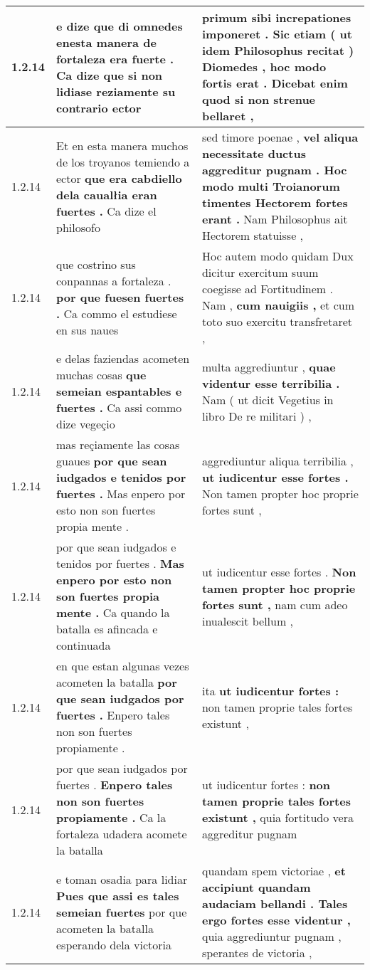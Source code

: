 \begin{tabular}{|p{1cm}|p{6.5cm}|p{6.5cm}|}
1.2.14 & e dize \textbf{ que di omnedes enesta manera de fortaleza era fuerte . } Ca dize que si non lidiase reziamente su contrario ector & primum sibi increpationes imponeret . Sic etiam ( ut idem Philosophus recitat ) Diomedes , \textbf{ hoc modo fortis erat . } Dicebat enim quod si non strenue bellaret , \\\hline
1.2.14 & Et en esta manera muchos de los troyanos temiendo a ector \textbf{ que era cabdiello dela caualłia eran fuertes . } Ca dize el philosofo & sed timore poenae , \textbf{ vel aliqua necessitate ductus aggreditur pugnam . Hoc modo multi Troianorum timentes Hectorem fortes erant . } Nam Philosophus ait Hectorem statuisse , \\\hline
1.2.14 & que costrino sus conpannas a fortaleza . \textbf{ por que fuesen fuertes . } Ca commo el estudiese en sus naues & Hoc autem modo quidam Dux dicitur exercitum suum coegisse ad Fortitudinem . Nam , \textbf{ cum nauigiis , } et cum toto suo exercitu transfretaret , \\\hline
1.2.14 & e delas faziendas acometen muchas cosas \textbf{ que semeian espantables e fuertes . } Ca assi commo dize vegeçio & multa aggrediuntur , \textbf{ quae videntur esse terribilia . } Nam ( ut dicit Vegetius in libro De re militari ) , \\\hline
1.2.14 & mas reçiamente las cosas guaues \textbf{ por que sean iudgados e tenidos por fuertes . } Mas enpero por esto non son fuertes propia mente . & aggrediuntur aliqua terribilia , \textbf{ ut iudicentur esse fortes . } Non tamen propter hoc proprie fortes sunt , \\\hline
1.2.14 & por que sean iudgados e tenidos por fuertes . \textbf{ Mas enpero por esto non son fuertes propia mente . } Ca quando la batalla es afincada e continuada & ut iudicentur esse fortes . \textbf{ Non tamen propter hoc proprie fortes sunt , } nam cum adeo inualescit bellum , \\\hline
1.2.14 & en que estan algunas vezes acometen la batalla \textbf{ por que sean iudgados por fuertes . } Enpero tales non son fuertes propiamente . & ita \textbf{ ut iudicentur fortes : } non tamen proprie tales fortes existunt , \\\hline
1.2.14 & por que sean iudgados por fuertes . \textbf{ Enpero tales non son fuertes propiamente . } Ca la fortaleza udadera acomete la batalla & ut iudicentur fortes : \textbf{ non tamen proprie tales fortes existunt , } quia fortitudo vera aggreditur pugnam \\\hline
1.2.14 & e toman osadia para lidiar \textbf{ Pues que assi es tales semeian fuertes } por que acometen la batalla esperando dela victoria & quandam spem victoriae , \textbf{ et accipiunt quandam audaciam bellandi . Tales ergo fortes esse videntur , } quia aggrediuntur pugnam , sperantes de victoria , \\\hline

\end{tabular}
